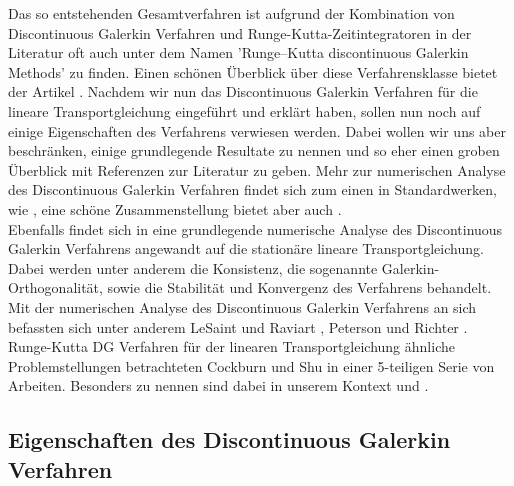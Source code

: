 Das so entstehenden Gesamtverfahren ist aufgrund der Kombination von Discontinuous Galerkin Verfahren und Runge-Kutta-Zeitintegratoren in der Literatur oft auch unter dem Namen 'Runge–Kutta discontinuous Galerkin Methods' zu finden. Einen schönen Überblick über diese Verfahrensklasse bietet der Artikel \cite{cockburn2001runge}.
Nachdem wir nun das Discontinuous Galerkin Verfahren für die lineare Transportgleichung eingeführt und erklärt haben, sollen nun noch auf einige Eigenschaften des Verfahrens verwiesen werden. Dabei wollen wir uns aber beschränken, einige grundlegende Resultate zu nennen und so eher einen groben Überblick mit Referenzen zur Literatur zu geben. Mehr zur numerischen Analyse des Discontinuous Galerkin Verfahren findet sich zum einen in Standardwerken, wie \cite{ern2004theory}, eine schöne Zusammenstellung bietet aber auch
\cite{Har08b}. \\
Ebenfalls findet sich in \cite{Har08b} eine grundlegende numerische Analyse des Discontinuous Galerkin Verfahrens angewandt auf die stationäre lineare Transportgleichung. Dabei werden unter anderem die Konsistenz, die sogenannte Galerkin-Orthogonalität, sowie die Stabilität und Konvergenz des Verfahrens behandelt.
Mit der numerischen Analyse des Discontinuous Galerkin Verfahrens an sich befassten sich unter anderem LeSaint und Raviart \cite{lesaint1974finite}, Peterson \cite{peterson1991note} und Richter \cite{richter1988optimal}.
Runge-Kutta DG Verfahren für der linearen Transportgleichung ähnliche Problemstellungen betrachteten Cockburn und Shu in einer 5-teiligen Serie von Arbeiten. Besonders zu nennen sind dabei in unserem Kontext \cite{cockburn1989tvb} und \cite{cockburn1990runge}.


\subsection{Eigenschaften des Discontinuous Galerkin Verfahren}
